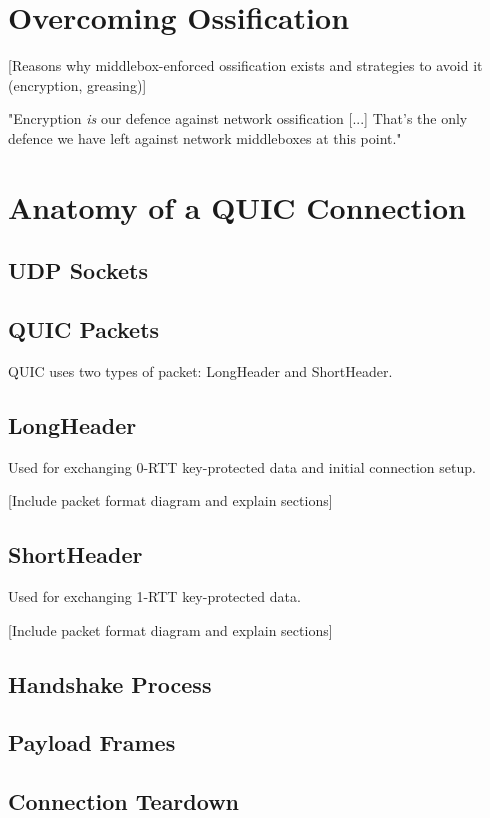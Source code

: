 \documentclass{l4proj}
\begin{document}
\section{Overcoming Ossification}
[Reasons why middlebox-enforced ossification exists and strategies to avoid it (encryption, greasing)]

"Encryption \textit{is} our defence against network ossification [...] That's the only defence we have left against network middleboxes at this point." \cite{iyengar-ossification}

\section{Anatomy of a QUIC Connection}

\subsection{UDP Sockets}

\subsection{QUIC Packets}
QUIC uses two types of packet: LongHeader and ShortHeader.

\subsection{LongHeader}
Used for exchanging 0-RTT key-protected data and initial connection setup.

[Include packet format diagram and explain sections]

\subsection{ShortHeader}
Used for exchanging 1-RTT key-protected data.

[Include packet format diagram and explain sections]

\subsection{Handshake Process}

\subsection{Payload Frames}

\subsection{Connection Teardown}
\end{document}
